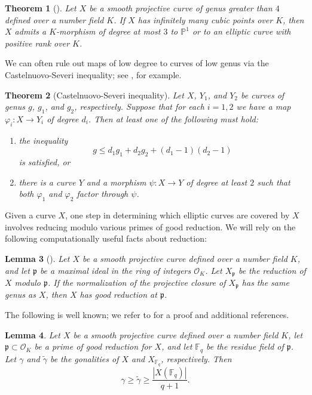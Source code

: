 \documentclass[12pt]{amsart}
\newtheorem{thm}{Theorem}[section]
\newtheorem{lem}[thm]{Lemma}
\theoremstyle{definition}
\newcommand{\bbF}{\mathbb{F}}
\newcommand{\bbP}{\mathbb{P}}
\newcommand{\calO}{\mathcal{O}}
\newcommand{\frakp}{\mathfrak{p}}
\renewcommand{\tilde}{\widetilde}
\numberwithin{equation}{section}
\begin{document}
\begin{thm}[{\cite[Theorem 1.2]{kadets/vogt:2025}}]\label{thm:KV}
    Let $X$ be a smooth projective curve of genus greater than $4$ defined over a number field $K$. If $X$ has infinitely many cubic points over $K$, then $X$ admits a $K$-morphism of degree at most $3$ to $\bbP^1$ or to an elliptic curve with positive rank over $K$.
\end{thm}

We can often rule out maps of low degree to curves of low genus via the Castelnuovo-Severi inequality; see \cite[Theorem 3.11.3]{stichtenoth:2009}, for example.

\begin{thm}[Castelnuovo-Severi inequality]\label{thm:CS}
    Let $X$, $Y_1$, and $Y_2$ be curves of genus $g$, $g_1$, and $g_2$, respectively. Suppose that for each $i=1,2$ we have a map $\varphi_i : X \to Y_i$ of degree $d_i$. Then at least one of the following must hold:
        \begin{enumerate}[label=(\alph*)]
            \item the inequality 
                \[
                g \le d_1g_1 + d_2g_2 + (d_1 - 1)(d_2 - 1)
                \]
            is satisfied, or
            \item there is a curve $Y$ and a morphism $\psi : X \to Y$ of degree at least $2$ such that both $\varphi_1$ and $\varphi_2$ factor through $\psi$.
        \end{enumerate}
\end{thm}

Given a curve $X$, one step in determining which elliptic curves are covered by $X$ involves reducing modulo various primes of good reduction. We will rely on the following computationally useful facts about reduction:
\begin{lem}[{\cite[Corollary 10.1.25]{liu:2002}}]\label{lem:liu_reduction}
    Let $X$ be a smooth projective curve defined over a number field $K$, and let $\frakp$ be a maximal ideal in the ring of integers $\calO_K$. Let $X_\frakp$ be the reduction of $X$ modulo $\frakp$. If the normalization of the projective closure of $X_\frakp$ has the same genus as $X$, then $X$ has good reduction at $\frakp$.
\end{lem}

The following is well known; we refer to \cite[Proposition 5]{xarles:2012} for a proof and additional references.
\begin{lem}\label{lem:gonality-point-count}
    Let $X$ be a smooth projective curve defined over a number field $K$, let $\frakp \subset \calO_K$ be a prime of good reduction for $X$, and let $\bbF_q$ be the residue field of $\frakp$. Let $\gamma$ and $\tilde\gamma$ be the gonalities of $X$ and $X_{\bbF_q}$, respectively. Then
        \[
        \gamma \ge \tilde\gamma \ge \frac{|X(\bbF_q)|}{q + 1}.
        \]
\end{lem}
\end{document}
